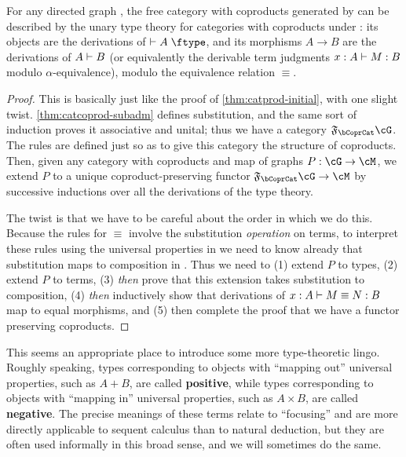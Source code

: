 \begin{thm}\label{thm:catcoprod-initial}
  For any directed graph \cG, the free category with coproducts generated by \cG can be described by the unary type theory for categories with coproducts under \cG: its objects are the derivations of $\types A\type$, and its morphisms $A\to B$ are the derivations of $A\vdash B$ (or equivalently the derivable term judgments $x:A \vdash M:B$ modulo $\alpha$-equivalence), modulo the equivalence relation $\equiv$.
\end{thm}
\begin{proof}
  This is basically just like the proof of \cref{thm:catprod-initial}, with one slight twist.
  \cref{thm:catcoprod-subadm} defines substitution, and the same sort of induction proves it associative and unital; thus we have a category $\F\bCoprCat\cG$.
  The rules are defined just so as to give this category the structure of coproducts.
  Then, given any category with coproducts \cM and map of graphs $P:\cG\to\cM$, we extend $P$ to a unique coproduct-preserving functor $\F\bCoprCat\cG\to\cM$ by successive inductions over all the derivations of the type theory.

  The twist is that we have to be careful about the order in which we do this.
  Because the rules for $\equiv$ involve the substitution \emph{operation} on terms, to interpret these rules using the universal properties in \cM we need to know already that substitution maps to composition in \cM.
  Thus we need to (1) extend $P$ to types, (2) extend $P$ to terms, (3) \emph{then} prove that this extension takes substitution to composition, (4) \emph{then} inductively show that derivations of $x:A\vdash M\equiv N:B$ map to equal morphisms, and (5) then complete the proof that we have a functor preserving coproducts.
\end{proof}


This seems an appropriate place to introduce some more type-theoretic lingo.
Roughly speaking, types corresponding to objects with ``mapping out'' universal properties, such as $A+B$, are called \textbf{positive}, while types corresponding to objects with ``mapping in'' universal properties, such as $A\times B$, are called \textbf{negative}.
The precise meanings of these terms relate to ``focusing'' and are more directly applicable to sequent calculus than to natural deduction, but they are often used informally in this broad sense, and we will sometimes do the same.


